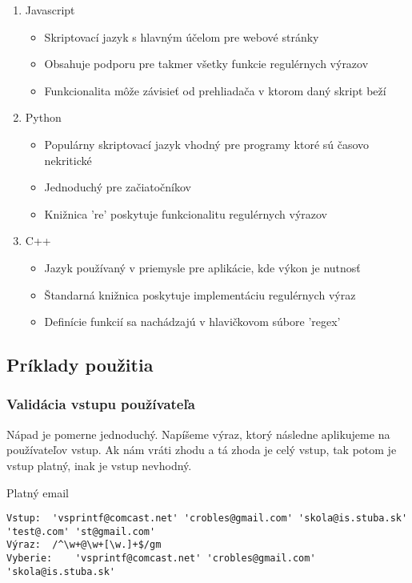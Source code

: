 \documentclass[10pt,twoside,slovak,a4paper]{article}
\begin{document}
\begin{enumerate}
	\item Javascript
	\begin{itemize}
		\item Skriptovací jazyk s hlavným účelom pre webové stránky
		\item Obsahuje podporu pre takmer všetky funkcie regulérnych výrazov
		\item Funkcionalita môže závisieť od prehliadača v ktorom daný skript beží
	\end{itemize}
	\item Python
	\begin{itemize}
		\item Populárny skriptovací jazyk vhodný pre programy ktoré sú časovo nekritické
		\item Jednoduchý pre začiatočníkov
		\item Knižnica 're' poskytuje funkcionalitu regulérnych výrazov
	\end{itemize}
	\item C++
	\begin{itemize}
		\item Jazyk používaný v priemysle pre aplikácie, kde výkon je nutnosť
		\item Štandarná knižnica poskytuje implementáciu regulérnych výraz
		\item Definície funkcií sa nachádzajú v hlavičkovom súbore 'regex'
	\end{itemize}
\end{enumerate}

\subsection{Príklady použitia}

\subsubsection{Validácia vstupu používateľa}
Nápad je pomerne jednoduchý. Napíšeme výraz, ktorý následne aplikujeme na používateľov vstup. Ak nám vráti zhodu a tá zhoda je celý vstup, tak potom je vstup platný, inak je vstup nevhodný.

Platný email
\begin{verbatim}
Vstup:	'vsprintf@comcast.net' 'crobles@gmail.com' 'skola@is.stuba.sk' 'test@.com' 'st@gmail.com'
Výraz:	/^\w+@\w+[\w.]+$/gm
Vyberie:	'vsprintf@comcast.net' 'crobles@gmail.com' 'skola@is.stuba.sk'
\end{verbatim}
\end{document}
